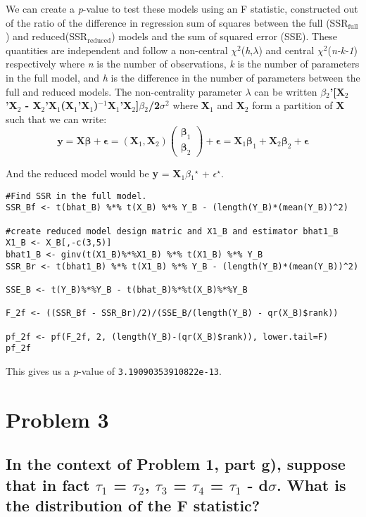 \documentclass[11pt]{article}
\begin{document}
We can create a \emph{p}-value to test these models using an F statistic,
constructed out of the ratio of the difference in regression sum of
squares between the full (SSR$_{\mathrm{full}}$) and reduced(SSR$_{\mathrm{reduced}}$) models and the sum of squared
error (SSE). These quantities are independent and follow a
non-central $\chi$$^2$(\emph{h},$\lambda$) and central $\chi$$^2$(\emph{n-k-1})
respectively where \emph{n} is the number of observations, \emph{k} is the
number of parameters in the full model, and \emph{h} is the difference in the
number of parameters between the full and reduced models. The
non-centrality parameter $\lambda$ can be written \textbf{$\beta$$_2$'[X$_2$'X$_2$ - X$_2$'X$_1$(X$_1$'X$_1$)$^{\mathrm{-1}}$X$_1$'X$_2$]$\beta$$_2$/2$\sigma$$^2$} where \textbf{X$_1$} and \textbf{X$_2$}
form a partition of \textbf{X} such that we can write: $$\mathbf{y} =
\mathbf{X\beta} + \mathbf{\epsilon} =
(\mathbf{X}_1,\mathbf{X}_2)\begin{pmatrix} \mathbf{\beta}_1
\\ \mathbf{\beta}_2 \end{pmatrix} + \mathbf{\epsilon} =
\mathbf{X}_1\mathbf{\beta}_1 + \mathbf{X}_2\mathbf{\beta}_2 +
\mathbf{\epsilon} $$

And the reduced model would be \textbf{y} = \textbf{X$_1$$\beta$$_1$$^{\star}$} + $\epsilon$$^{\star}$.



\begin{verbatim}
#Find SSR in the full model.
SSR_Bf <- t(bhat_B) %*% t(X_B) %*% Y_B - (length(Y_B)*(mean(Y_B))^2)

#create reduced model design matric and X1_B and estimator bhat1_B
X1_B <- X_B[,-c(3,5)]
bhat1_B <- ginv(t(X1_B)%*%X1_B) %*% t(X1_B) %*% Y_B
SSR_Br <- t(bhat1_B) %*% t(X1_B) %*% Y_B - (length(Y_B)*(mean(Y_B))^2)

SSE_B <- t(Y_B)%*%Y_B - t(bhat_B)%*%t(X_B)%*%Y_B

F_2f <- ((SSR_Bf - SSR_Br)/2)/(SSE_B/(length(Y_B) - qr(X_B)$rank))

pf_2f <- pf(F_2f, 2, (length(Y_B)-(qr(X_B)$rank)), lower.tail=F)
pf_2f
\end{verbatim}

This gives us a \emph{p}-value of \texttt{3.19090353910822e-13}.
\section{Problem 3}
\label{sec-3}
\subsection{In the context of Problem 1, part g), suppose that in fact $\tau$$_1$ = $\tau$$_2$, $\tau$$_3$ = $\tau$$_4$ = $\tau$$_1$ - d$\sigma$. What is the distribution of the F statistic?}
\label{sec-3-1}
\end{document}
